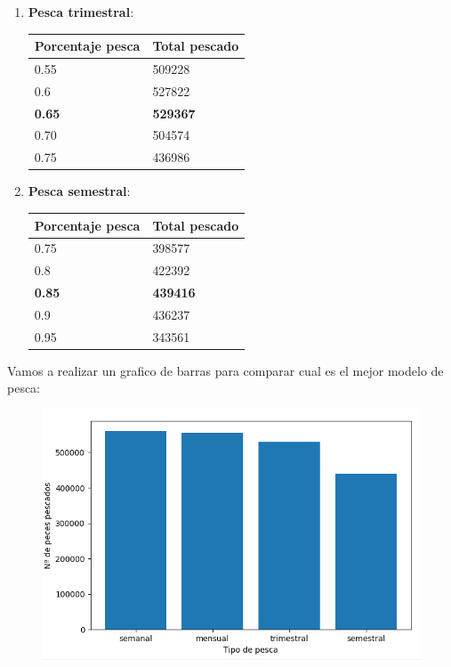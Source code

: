 \documentclass[]{article}
\begin{document}
\begin{enumerate}
\begin{table}[H]
	\end{table}
	\item \textbf{Pesca trimestral}:
	\begin{table}[H]
		\begin{center}
			\begin{tabular}{|l|l|}
				\hline
				Porcentaje pesca & Total pescado\\
				\hline \hline
				0.55 & 509228
				\\ \hline
				0.6 & 527822
				\\ \hline
				\textbf{0.65} & \textbf{529367}
				\\ \hline
				0.70 & 504574
				\\ \hline
				0.75 & 436986
				\\ \hline
			\end{tabular}
			\label{tabla:sencilla}
		\end{center}
	\end{table}
	\item \textbf{Pesca semestral}:
	
	\begin{table}[H]
		\begin{center}
			\begin{tabular}{|l|l|}
				\hline
				Porcentaje pesca & Total pescado\\
				\hline \hline
				0.75 & 398577
				\\ \hline
				0.8 & 422392
				\\ \hline
				\textbf{0.85} & \textbf{439416}
				\\ \hline
				0.9 & 436237
				\\ \hline
				0.95 & 343561
				\\ \hline
			\end{tabular}
			\label{tabla:sencilla}
		\end{center}
	\end{table}
\end{enumerate}


Vamos a realizar un grafico de barras para comparar cual es el mejor modelo de pesca:
\begin{figure}[H]
	\centering
	\includegraphics[width=1\linewidth]{img/screenshot0025}
	\caption{}
	\label{fig:screenshot0025}
\end{figure}
\end{document}
